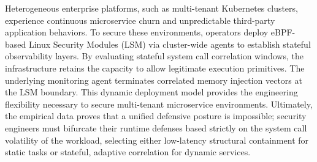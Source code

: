 Heterogeneous enterprise platforms, such as multi-tenant Kubernetes clusters, experience continuous microservice churn and unpredictable third-party application behaviors. To secure these environments, operators deploy eBPF-based Linux Security Modules (LSM) via cluster-wide agents to establish stateful observability layers. By evaluating stateful system call correlation windows, the infrastructure retains the capacity to allow legitimate execution primitives. The underlying monitoring agent terminates correlated memory injection vectors at the LSM boundary. This dynamic deployment model provides the engineering flexibility necessary to secure multi-tenant microservice environments. Ultimately, the empirical data proves that a unified defensive posture is impossible; security engineers must bifurcate their runtime defenses based strictly on the system call volatility of the workload, selecting either low-latency structural containment for static tasks or stateful, adaptive correlation for dynamic services.